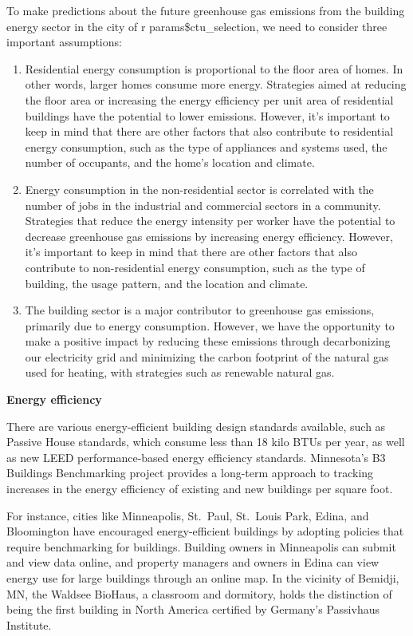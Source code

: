 \documentclass[
]{book}
\begin{document}
To make predictions about the future greenhouse gas emissions from the building energy sector in the city of r params\$ctu\_selection, we need to consider three important assumptions:

\begin{enumerate}
\def\labelenumi{\arabic{enumi})}
\item
  Residential energy consumption is proportional to the floor area of homes. In other words, larger homes consume more energy. Strategies aimed at reducing the floor area or increasing the energy efficiency per unit area of residential buildings have the potential to lower emissions. However, it's important to keep in mind that there are other factors that also contribute to residential energy consumption, such as the type of appliances and systems used, the number of occupants, and the home's location and climate.
\item
  Energy consumption in the non-residential sector is correlated with the number of jobs in the industrial and commercial sectors in a community. Strategies that reduce the energy intensity per worker have the potential to decrease greenhouse gas emissions by increasing energy efficiency. However, it's important to keep in mind that there are other factors that also contribute to non-residential energy consumption, such as the type of building, the usage pattern, and the location and climate.
\item
  The building sector is a major contributor to greenhouse gas emissions, primarily due to energy consumption. However, we have the opportunity to make a positive impact by reducing these emissions through decarbonizing our electricity grid and minimizing the carbon footprint of the natural gas used for heating, with strategies such as renewable natural gas.
\end{enumerate}

\textbf{Energy efficiency}

There are various energy-efficient building design standards available, such as Passive House standards, which consume less than 18 kilo BTUs per year, as well as new LEED performance-based energy efficiency standards. Minnesota's B3 Buildings Benchmarking project provides a long-term approach to tracking increases in the energy efficiency of existing and new buildings per square foot.

For instance, cities like Minneapolis, St.~Paul, St.~Louis Park, Edina, and Bloomington have encouraged energy-efficient buildings by adopting policies that require benchmarking for buildings. Building owners in Minneapolis can submit and view data online, and property managers and owners in Edina can view energy use for large buildings through an online map. In the vicinity of Bemidji, MN, the Waldsee BioHaus, a classroom and dormitory, holds the distinction of being the first building in North America certified by Germany's Passivhaus Institute.
\end{document}
